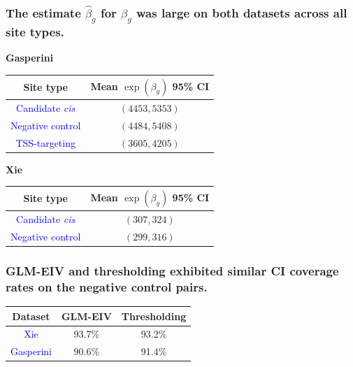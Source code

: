\documentclass{beamer}
\begin{document}
\begin{frame}
\frametitle{The estimate $\hat{\beta}_g$ for $\beta_g$ was large on both datasets across all site types.}
\begin{center}
\textbf{Gasperini}
\end{center}
\begin{center}
\begin{tabular}{|c|c|}
	\hline 
	Site type & Mean $\exp\left(\beta_g\right)$ 95\% CI \\ 
	\hline 
 	 \textcolor{blue}{Candidate \textit{cis}} & $(4453, 5353)$ \\ 
	\hline 
	\textcolor{blue}{Negative control} &  $(4484, 5408)$ \\ 
	\hline
	\textcolor{blue}{TSS-targeting} & $(3605, 4205)$ \\
	\hline
\end{tabular} 
\end{center}

\begin{center}
	\textbf{Xie}
\end{center}
\begin{center}
	\begin{tabular}{|c|c|}
		\hline 
		Site type & Mean $\exp\left(\beta_g\right)$ 95\% CI \\ 
		\hline 
		\textcolor{blue}{Candidate \textit{cis}} & $(307, 324)$ \\ 
		\hline 
		\textcolor{blue}{Negative control} &  $(299, 316)$ \\
		\hline
	\end{tabular} 
\end{center}



\end{frame}


\begin{frame}
\frametitle{GLM-EIV and thresholding exhibited similar CI coverage rates on the negative control pairs.}
\begin{center}
\begin{tabular}{|c|c|c|}
	\hline 
	Dataset & GLM-EIV & Thresholding \\ 
	\hline 
	\textcolor{blue}{Xie} & 93.7\% & 93.2\% \\ 
	\hline 
	\textcolor{blue}{Gasperini} & 90.6\% & 91.4\%  \\ 
	\hline 
\end{tabular}
\end{center}
\end{frame}
\end{document}

